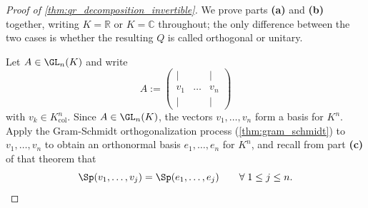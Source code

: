 \begin{proof}[Proof of \cref{thm:qr_decomposition_invertible}]
We prove parts \textbf{(a)} and \textbf{(b)} together, writing $K = \mathbb{R}$ or $K = \mathbb{C}$ throughout; the only difference between the two cases is whether the resulting $Q$ is called orthogonal or unitary.

Let $A \in \GL_n(K)$ and write
\[
    A := \begin{pmatrix} | & & | \\ v_1 & \dots & v_n \\ | & & | \end{pmatrix}
\]
with $v_k \in K_{\text{col}}^n$. Since $A \in \GL_n(K)$, the vectors $v_1, \dots, v_n$ form a basis for $K^n$. Apply the Gram-Schmidt orthogonalization process (\cref{thm:gram_schmidt}) to $v_1, \dots, v_n$ to obtain an orthonormal basis $e_1, \dots, e_n$ for $K^n$, and recall from part \textbf{(c)} of that theorem that
\begin{equation} \label{eq:qr_nested_spans}
    \Sp(v_1, \dots, v_j) = \Sp(e_1, \dots, e_j) \qquad \forall \; 1 \le j \le n.
\end{equation}


\end{proof}
